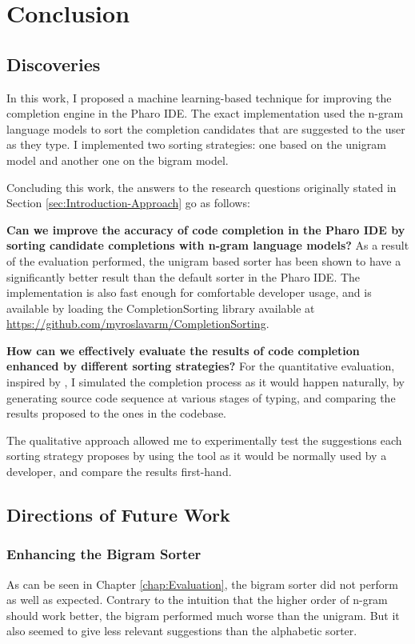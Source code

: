 \chapter{Conclusion}
\label{chap:Conclusion}
\section{Discoveries}
\label{sec:Conclusion-Discoveries}
In this work, I proposed a machine learning-based technique for improving the completion engine in the Pharo IDE. The exact implementation used the n-gram language models to sort the completion candidates that are suggested to the user as they type. I implemented two sorting strategies: one based on the unigram model and another one on the bigram model.

Concluding this work, the answers to the research questions originally stated in Section \ref{sec:Introduction-Approach} go as follows:
\begin{RQ}
    \item \textbf{Can we improve the accuracy of code completion in the Pharo IDE by sorting candidate completions with n-gram language models?} As a result of the evaluation performed, the unigram based sorter has been shown to have a significantly better result than the default sorter in the Pharo IDE. The implementation is also fast enough for comfortable developer usage, and is available by loading the CompletionSorting library available at \url{https://github.com/myroslavarm/CompletionSorting}.
    \item \textbf{How can we effectively evaluate the results of code completion enhanced by different sorting strategies?} For the quantitative evaluation, inspired by \cite{Robb08a}, I simulated the completion process as it would happen naturally, by generating source code sequence at various stages of typing, and comparing the results proposed to the ones in the codebase.
    
    The qualitative approach allowed me to experimentally test the suggestions each sorting strategy proposes by using the tool as it would be normally used by a developer, and compare the results first-hand.
\end{RQ}

\section{Directions of Future Work}
\label{sec:Conclusion-FutureWork}
\subsection{Enhancing the Bigram Sorter}
As can be seen in Chapter \ref{chap:Evaluation}, the bigram sorter did not perform as well as expected. Contrary to the intuition that the higher order of n-gram should work better, the bigram performed much worse than the unigram. But it also seemed to give less relevant suggestions than the alphabetic sorter.

